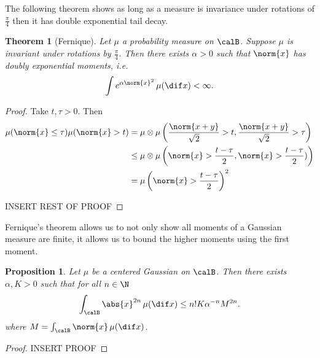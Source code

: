\documentclass[fontsize=12pt, DIV=10]{scrreprt}
\theoremstyle{mydefn}
\newtheorem{theorem}{Theorem}
\newtheorem{prop}{Proposition}
\theoremstyle{remark}
\begin{document}
The following theorem shows as long as a measure is invariance under rotations of $\frac{\pi}{4}$ then it has double exponential tail decay.
\begin{theorem}[Fernique]
	Let $\mu$ a probability measure on $\calB$. Suppose $\mu$ is invariant under rotations by $\frac{\pi}{4}$. Then there exists $\alpha > 0$ such that $\norm{x}$ has doubly exponential moments, i.e.\
	\begin{equation}
		\int e^{\alpha \norm{x}^2} \, \mu(\dif x) < \infty.
	\end{equation}
\end{theorem}
\begin{proof}
	Take $t, \tau > 0$. Then
	\begin{align}
		\mu(\norm{x} \leq \tau) \mu(\norm{x} > t)
		&= \mu \otimes \mu\left( \frac{\norm{x + y}}{\sqrt{2}} > t, \frac{\norm{x+y}}{\sqrt{2}} > \tau \right) \\
		&\leq \mu \otimes \mu \left(\norm{x} > \frac{t - \tau}{2}, \norm{x} > \frac{t - \tau}{2}) \right) \\
		&= \mu\left(\norm{x} > \frac{t - \tau}{2}\right)^2
	\end{align}

	INSERT REST OF PROOF
\end{proof}

Fernique's theorem allows us to not only show all moments of a Gaussian measure are finite, it allows us to bound the higher moments using the first moment.

\begin{prop}
	Let $\mu$ be a centered Gaussian on $\calB$. Then there exists $\alpha, K > 0$ such that for all $n \in \N$
	\begin{equation}
		\int_{\calB} \abs{x}^{2n} \, \mu(\dif x) \leq n! K \alpha^{-n} M^{2n}.
	\end{equation}
	where $M = \int_{\calB} \norm{x} \, \mu(\dif x)$.
\end{prop}
\begin{proof}
	INSERT PROOF
\end{proof}
\end{document}
